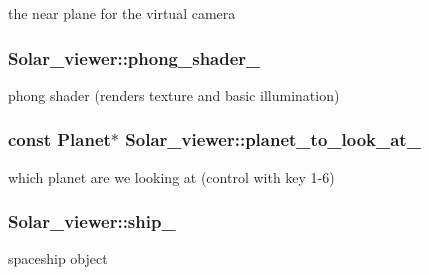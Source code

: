 the near plane for the virtual camera 

\subsubsection[{\texorpdfstring{phong\+\_\+shader\+\_\+}{phong_shader_}}]{ Solar\+\_\+viewer\+::phong\+\_\+shader\+\_\+\hspace{0.3cm}{\ttfamily [private]}}\hypertarget{classSolar__viewer_a3f0eaae53b84778ce774d1c2ced29b9f}{}\label{classSolar__viewer_a3f0eaae53b84778ce774d1c2ced29b9f}


phong shader (renders texture and basic illumination) 

\subsubsection[{\texorpdfstring{planet\+\_\+to\+\_\+look\+\_\+at\+\_\+}{planet_to_look_at_}}]{\setlength{\rightskip}{0pt plus 5cm}const {\bf Planet}$\ast$ Solar\+\_\+viewer\+::planet\+\_\+to\+\_\+look\+\_\+at\+\_\+\hspace{0.3cm}{\ttfamily [private]}}\hypertarget{classSolar__viewer_af0b149d27213a8b45e5672c2e1d5b53a}{}\label{classSolar__viewer_af0b149d27213a8b45e5672c2e1d5b53a}


which planet are we looking at (control with key 1-\/6) 

\subsubsection[{\texorpdfstring{ship\+\_\+}{ship_}}]{ Solar\+\_\+viewer\+::ship\+\_\+\hspace{0.3cm}{\ttfamily [private]}}\hypertarget{classSolar__viewer_a15b5951427b3a4abad4715255c94f2bd}{}\label{classSolar__viewer_a15b5951427b3a4abad4715255c94f2bd}


spaceship object 

